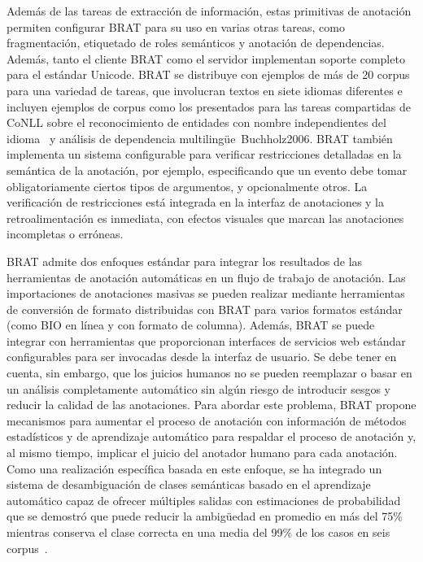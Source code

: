 Además de las tareas de extracción de información, estas primitivas de anotación permiten configurar BRAT para su uso en varias otras tareas, como fragmentación, etiquetado de roles semánticos y anotación de dependencias.
Además, tanto el cliente BRAT como el servidor implementan soporte completo para el estándar Unicode.
BRAT se distribuye con ejemplos de más de 20 corpus para una variedad de tareas, que involucran textos en siete idiomas diferentes e incluyen ejemplos de corpus como los presentados para las tareas compartidas de CoNLL sobre el reconocimiento de entidades con nombre independientes del idioma~\cite{TjongKimSang2003} y análisis de dependencia multilingüe~{Buchholz2006}.
BRAT también implementa un sistema configurable para verificar restricciones detalladas en la semántica de la anotación, por ejemplo, especificando que un evento debe tomar obligatoriamente ciertos tipos de argumentos, y opcionalmente otros.
La verificación de restricciones está integrada en la interfaz de anotaciones y la retroalimentación es inmediata, con efectos visuales que marcan las anotaciones incompletas o erróneas.

BRAT admite dos enfoques estándar para integrar los resultados de las herramientas de anotación automáticas en un flujo de trabajo de anotación.
Las importaciones de anotaciones masivas se pueden realizar mediante herramientas de conversión de formato distribuidas con BRAT para varios formatos estándar (como BIO en línea y con formato de columna).
Además, BRAT se puede integrar con herramientas que proporcionan interfaces de servicios web estándar configurables para ser invocadas desde la interfaz de usuario.
Se debe tener en cuenta, sin embargo, que los juicios humanos no se pueden reemplazar o basar en un análisis completamente automático sin algún riesgo de introducir sesgos y reducir la calidad de las anotaciones.
Para abordar este problema, BRAT propone mecanismos para aumentar el proceso de anotación con información de métodos estadísticos y de aprendizaje automático para respaldar el proceso de anotación y, al mismo tiempo, implicar el juicio del anotador humano para cada anotación.
Como una realización específica basada en este enfoque, se ha integrado un sistema de desambiguación de clases semánticas basado en el aprendizaje automático capaz de ofrecer múltiples salidas con estimaciones de probabilidad que se demostró que puede reducir la ambigüedad en promedio en más del 75\% mientras conserva el clase correcta en una media del 99\% de los casos en seis corpus~\cite{Stenetorp2011}.

